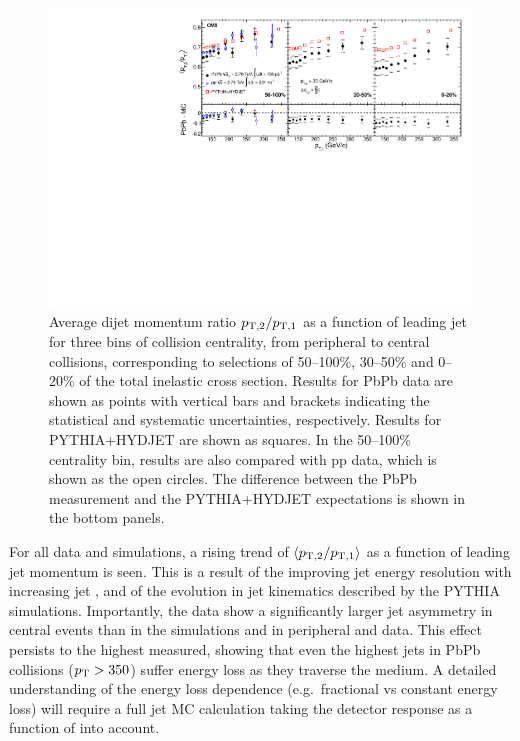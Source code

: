 \begin{figure}[!h]
\begin{center}
\includegraphics[width=0.49\mboxwidth]{jetfigures/deltaPtOverPt5_lead120_sub30_diff_20120103.pdf}
\caption[]{Average dijet momentum ratio $p_{\rm{T},2}/p_{\rm{T},1}$ as a function of
leading jet \pt for three bins of collision centrality, from peripheral to central collisions,
corresponding to selections of 50--100\%,  30--50\% and 0--20\%  of the total inelastic cross section.
Results for PbPb data are shown as points with vertical bars and brackets indicating
the statistical and systematic uncertainties, respectively.  Results for PYTHIA+HYDJET are shown as squares. In the 50--100\% centrality bin,
results are also compared with pp data, which is shown as the open circles.
The difference between the PbPb measurement and the PYTHIA+HYDJET expectations is shown in the bottom panels. }
\label{fig:GR:CMS_pt_ratio}
\end{center}
\end{figure}

For all data and simulations, a rising trend of $\langle p_{\rm{T},2}/p_{\rm{T},1} \rangle$ as a function
of leading jet momentum is seen. This is a result of the improving jet energy resolution
with increasing jet \pt, and of the evolution in jet kinematics described by the PYTHIA 
simulations. Importantly, the data show a significantly larger jet asymmetry in central events
than in the simulations and in peripheral and \pp data. This effect persists to the 
highest \pt measured, showing that even the highest \pt jets in PbPb collisions ($p_{\rm{T}} > 350$\GeVc)
suffer energy loss as they traverse the medium. A detailed understanding of the energy loss
\pt dependence (e.g.\ fractional vs constant energy loss) will require a full jet MC calculation
taking the detector response as a function of \pt into account.

